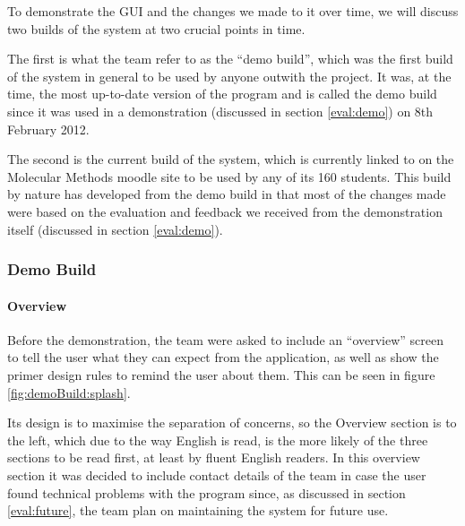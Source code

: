 To demonstrate the GUI and the changes we made to it over time, we
will discuss two builds of the system at two crucial points in time.

The first is what the team refer to as the ``demo build'', which was
the first build of the system in general to be used by anyone outwith
the project.
It was, at the time, the most up-to-date version of the program and is
called the demo build since it was used in a demonstration (discussed
in section \ref{eval:demo}) on 8th February 2012.

The second is the current build of the system, which is currently
linked to on the Molecular Methods moodle site to be used by any of
its 160 students.
This build by nature has developed from the demo build in that most of
the changes made were based on the evaluation and feedback we received
from the demonstration itself (discussed in section \ref{eval:demo}).

\subsubsection{Demo Build}

\paragraph{Overview}

Before the demonstration, the team were asked to include an
``overview'' screen to tell the user what they can expect from the
application, as well as show the primer design rules to remind the
user about them.
This can be seen in figure \ref{fig:demoBuild:splash}.

Its design is to maximise the separation of concerns, so the Overview
section is to the left, which due to the way English is read, is the
more likely of the three sections to be read first, at least by fluent
English readers.
In this overview section it was decided to include contact details
of the team in case the user found technical problems with the
program since, as discussed in section \ref{eval:future}, the
team plan on maintaining the system for future use.

